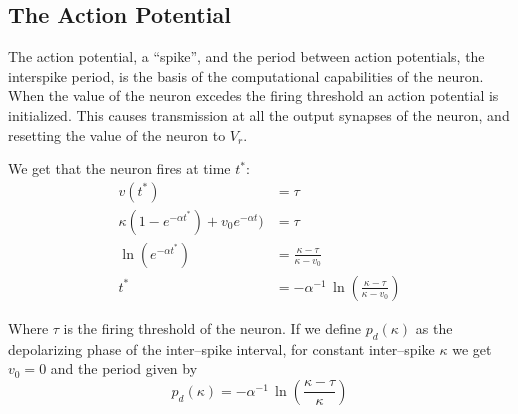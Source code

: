 


\subsection{The Action Potential}
The action potential, a ``spike'', and the period between action potentials, the interspike period, is the basis of the computational capabilities of the neuron.
When the value of the neuron excedes the firing threshold an action potential is initialized.
This causes transmission at all the output synapses of the neuron, and resetting the value of the neuron to $V_r$.

We get that the neuron fires at time $t^*$:
\begin{equation}
	\label{eqTidTilFyringVedEndraKappa}
	\begin{split}
			v(t^*) 					 							&= \tau \qquad 										\\	%
			\kappa (1-e^{-\alpha t^*}) + v_0 e^{-\alpha t})		&= \tau 											\\
			\ln \left(e^{-\alpha t^*}\right) 					&= \frac{\kappa - \tau}{\kappa - v_0} 					\\
			t^*													&= -\alpha^{-1} \, \ln \left( \frac{\kappa - \tau}{\kappa - v_0} \right) 					
	\end{split}
\end{equation}

Where $\tau$ is the firing threshold of the neuron. 
If we define $p_d(\kappa)$ as the depolarizing phase of the inter--spike interval, for constant inter--spike $\kappa$ we get $v_0 = 0$ and the period given by
\begin{equation}
	\label{eqPeriodeligningForKonstIntraPeriodKAPPA}
	p_d(\kappa) = -\alpha^{-1} \, \ln(\frac{\kappa - \tau}{\kappa})
\end{equation}

